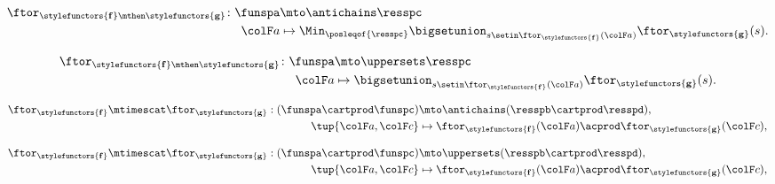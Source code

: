 \begin{forslides}
    \begin{equation}
        \label{eq:h_example_berk_series}
        \begin{aligned}
            {\displaystyle \ftor_{\stylefunctors{\mathbf{f}}\mthen \stylefunctors{\mathbf{g}}}\colon\funspa}
                                          & \mto\antichains \resspc \\
            \ensuremath{{\colF a}}\xspace & \mapsto\Min_{\posleqof{\resspc}}\bigsetunion_{s\setin\ftor_{\stylefunctors{\mathbf{f}}}(\ensuremath{{\colF a}}\xspace)}\ftor_{\stylefunctors{\mathbf{g}}}(s).
        \end{aligned}
    \end{equation}

    \begin{equation}
        \label{eq:h_example_berk_series_u}
        \begin{aligned}
            {\displaystyle \ftor_{\stylefunctors{\mathbf{f}}\mthen \stylefunctors{\mathbf{g}}}\colon\funspa}
                                          & \mto\uppersets \resspc \\
            \ensuremath{{\colF a}}\xspace & \mapsto\bigsetunion_{s\setin\ftor_{\stylefunctors{\mathbf{f}}}(\ensuremath{{\colF a}}\xspace)}\ftor_{\stylefunctors{\mathbf{g}}}(s).
        \end{aligned}
    \end{equation}

    \begin{equation}
        \label{eq:h_example_berk_par}
        \begin{aligned}
            \ftor_{\stylefunctors{\mathbf{f}}}\mtimescat\ftor_{\stylefunctors{\mathbf{g}}}:(\funspa \cartprod\funspc) & \mto\antichains(\resspb \cartprod\resspd), \\
            \tup{\ensuremath{{\colF a}}\xspace,\ensuremath{{\colF c}}\xspace}                                         & \mapsto\ftor_{\stylefunctors{\mathbf{f}}}(\ensuremath{{\colF a}}\xspace)\acprod\ftor_{\stylefunctors{\mathbf{g}}}(\ensuremath{{\colF c}}\xspace),\nonumber
        \end{aligned}
    \end{equation}

    \begin{equation}
        \label{eq:h_example_berk_par_u}
        \begin{aligned}
            \ftor_{\stylefunctors{\mathbf{f}}}\mtimescat\ftor_{\stylefunctors{\mathbf{g}}}:(\funspa \cartprod\funspc) & \mto\uppersets(\resspb \cartprod\resspd), \\
            \tup{\ensuremath{{\colF a}}\xspace,\ensuremath{{\colF c}}\xspace}                                         & \mapsto\ftor_{\stylefunctors{\mathbf{f}}}(\ensuremath{{\colF a}}\xspace)\acprod\ftor_{\stylefunctors{\mathbf{g}}}(\ensuremath{{\colF c}}\xspace),\nonumber
        \end{aligned}
    \end{equation}


\end{forslides}
